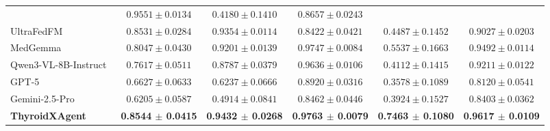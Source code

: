 \documentclass[fleqn,10pt]{wlscirep}
\begin{document}
\begin{appendices}
\begin{table}[p]
\begin{threeparttable}
\begin{tabular}{lccccc}
& $0.9551 \pm 0.0134$
& $0.4180 \pm 0.1410$
& $0.8657 \pm 0.0243$ \\
UltraFedFM~\cite{jiang2025pretraining}
& $0.8531 \pm 0.0284$
& $0.9354 \pm 0.0114$
& $0.8422 \pm 0.0421$
& $0.4487 \pm 0.1452$
& $0.9027 \pm 0.0203$ \\
MedGemma~\cite{sellergren2025medgemma}
& $0.8047 \pm 0.0430$
& $0.9201 \pm 0.0139$
& $0.9747 \pm 0.0084$
& $0.5537 \pm 0.1663$
& $0.9492 \pm 0.0114$ \\
Qwen3-VL-8B-Instruct~\cite{bai2025qwen3}
& $0.7617 \pm 0.0511$
& $0.8787 \pm 0.0379$
& $0.9636 \pm 0.0106$
& $0.4112 \pm 0.1415$
& $0.9211 \pm 0.0122$ \\
GPT-5~\cite{openai2025gpt5systemcard}
& $0.6627 \pm 0.0633$
& $0.6237 \pm 0.0666$
& $0.8920 \pm 0.0316$
& $0.3578 \pm 0.1089$
& $0.8120 \pm 0.0541$ \\
Gemini-2.5-Pro~\cite{comanici_gemini_2025}
& $0.6205 \pm 0.0587$
& $0.4914 \pm 0.0841$
& $0.8462 \pm 0.0446$
& $0.3924 \pm 0.1527$
& $0.8403 \pm 0.0362$ \\
\rowcolor{lightgray}
\textbf{ThyroidXAgent}
& \textbf{0.8544 $\pm$ 0.0415}
& \textbf{0.9432 $\pm$ 0.0268}
& \textbf{0.9763 $\pm$ 0.0079}
& \textbf{0.7463 $\pm$ 0.1080}
& \textbf{0.9617 $\pm$ 0.0109} \\
\bottomrule
\end{tabular}
\end{threeparttable}
\end{table}


\end{appendices}
\end{document}
